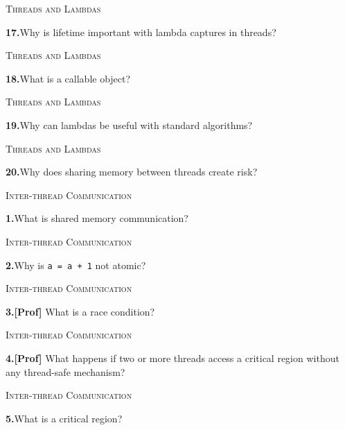 \documentclass[11pt,a4paper]{article}
\newenvironment{questionblock}{%
  \begin{minipage}[t][0.455\textheight][t]{\textwidth}%
  \raggedright\small
}{%
  \vfill
  \end{minipage}%
}
\newcommand{\sectionlabel}[1]{\textsc{#1}\par\vspace{0.35em}}
\newcommand{\questionnumber}[1]{\textbf{#1.}\enspace}
\begin{document}
\newpage
\begin{questionblock}
\sectionlabel{Threads and Lambdas}
\questionnumber{17}Why is lifetime important with lambda captures in threads?\par
\end{questionblock}
\vspace*{0.04\textheight}
\begin{questionblock}
\sectionlabel{Threads and Lambdas}
\questionnumber{18}What is a callable object?\par
\end{questionblock}
\newpage
\begin{questionblock}
\sectionlabel{Threads and Lambdas}
\questionnumber{19}Why can lambdas be useful with standard algorithms?\par
\end{questionblock}
\vspace*{0.04\textheight}
\begin{questionblock}
\sectionlabel{Threads and Lambdas}
\questionnumber{20}Why does sharing memory between threads create risk?\par

\end{questionblock}
\newpage
\begin{questionblock}
\sectionlabel{Inter-thread Communication}
\questionnumber{1}What is shared memory communication?\par
\end{questionblock}
\vspace*{0.04\textheight}
\begin{questionblock}
\sectionlabel{Inter-thread Communication}
\questionnumber{2}Why is \verb|a = a + 1| not atomic?\par
\end{questionblock}
\newpage
\begin{questionblock}
\sectionlabel{Inter-thread Communication}
\questionnumber{3}\textbf{[Prof]} What is a race condition?\par
\end{questionblock}
\vspace*{0.04\textheight}
\begin{questionblock}
\sectionlabel{Inter-thread Communication}
\questionnumber{4}\textbf{[Prof]} What happens if two or more threads access a critical region without any thread-safe mechanism?\par
\end{questionblock}
\newpage
\begin{questionblock}
\sectionlabel{Inter-thread Communication}
\questionnumber{5}What is a critical region?\par
\end{questionblock}
\end{document}
